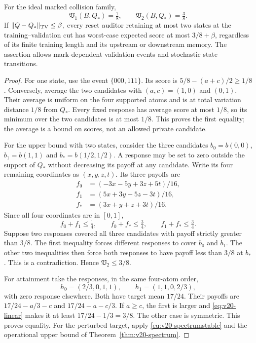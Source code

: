 \begin{theorem}
\label{thm:v20-two}
For the ideal marked collision family,
\begin{equation}\label{eq:v20-two}
 \mathfrak V_1(B,Q_*)=\tfrac18,
 \qquad \mathfrak V_2(B,Q_*)=\tfrac38.
\end{equation}
If $\|Q-Q_*\|_{\rm TV}\le\beta$, every reset auditor retaining at most
two states at the training--validation cut has worst-case expected score
at most $3/8+\beta$, regardless of its finite training length and its
upstream or downstream memory. The assertion allows mark-dependent
validation events and stochastic state transitions.
\end{theorem}
\begin{proof}
For one state, use the event $\{000,111\}$. Its score is
$5/8-(a+c)/2\ge1/8$. Conversely, average the two candidates with
$(a,c)=(1,0)$ and $(0,1)$. Their average is uniform on the four supported
atoms and is at total variation distance $1/8$ from $Q_*$. Every fixed
response has average score at most $1/8$, so its minimum over the two
candidates is at most $1/8$. This proves the first equality; the average
is a bound on scores, not an allowed private candidate.

For the upper bound with two states, consider the three candidates
$b_0=b(0,0)$, $b_1=b(1,1)$ and $b_*=b(1/2,1/2)$. A response may be
set to zero outside the support of $Q_*$ without decreasing its payoff
at any candidate. Write its four remaining coordinates as $(x,y,z,t)$.
Its three payoffs are
\begin{align*}
 f_0&=(-3x-5y+3z+5t)/16,\\
 f_1&=(5x+3y-5z-3t)/16,\\
 f_*&=(3x+y+z+3t)/16.
\end{align*}
Since all four coordinates are in $[0,1]$,
\begin{equation}\label{eq:v20-triangle}
 f_0+f_1\le\tfrac14,
 \qquad f_0+f_*\le\tfrac34,
 \qquad f_1+f_*\le\tfrac34.
\end{equation}
Suppose two responses covered all three candidates with payoff strictly
greater than $3/8$. The first inequality forces different responses to
cover $b_0$ and $b_1$. The other two inequalities then force both responses
to have payoff less than $3/8$ at $b_*$. This is a contradiction. Hence
$\mathfrak V_2\le3/8$.

For attainment take the responses, in the same four-atom order,
\[
 h_0=(2/3,0,1,1),\qquad h_1=(1,1,0,2/3),
\]
with zero response elsewhere. Both have target mean $17/24$. Their
payoffs are $17/24-a/3-c$ and $17/24-a-c/3$. If $a\ge c$, the first
is larger and \eqref{eq:v20-linear} makes it at least
$17/24-1/3=3/8$. The other case is symmetric. This proves equality.
For the perturbed target, apply \eqref{eq:v20-spectrumstable} and the
operational upper bound of Theorem~\ref{thm:v20-spectrum}.
\end{proof}

